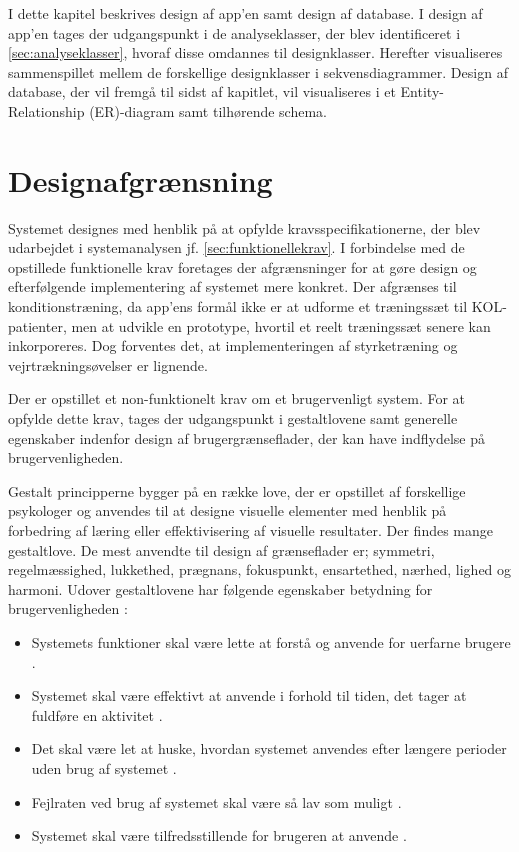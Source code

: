 I dette kapitel beskrives design af app'en samt design af database. I design af app'en tages der udgangspunkt i de analyseklasser, der blev identificeret i \autoref{sec:analyseklasser}, hvoraf disse omdannes til designklasser. Herefter visualiseres sammenspillet mellem de forskellige designklasser i sekvensdiagrammer. Design af database, der vil fremgå til sidst af kapitlet, vil visualiseres i et Entity-Relationship (ER)-diagram samt tilhørende schema. 

\section{Designafgrænsning} \label{sec:brugervenlighed}
Systemet designes med henblik på at opfylde kravsspecifikationerne, der blev udarbejdet i systemanalysen jf. \autoref{sec:funktionellekrav}. I forbindelse med de opstillede funktionelle krav foretages der afgrænsninger for at gøre design og efterfølgende implementering af systemet mere konkret. Der afgrænses til konditionstræning, da app'ens formål ikke er at udforme et træningssæt til KOL-patienter, men at udvikle en prototype, hvortil et reelt træningssæt senere kan inkorporeres. Dog forventes det, at implementeringen af styrketræning og vejrtrækningsøvelser er lignende. 

Der er opstillet et non-funktionelt krav om et brugervenligt system. For at opfylde dette krav, tages der udgangspunkt i gestaltlovene samt generelle egenskaber indenfor design af brugergrænseflader, der kan have indflydelse på brugervenligheden. 

Gestalt principperne bygger på en række love, der er opstillet af forskellige psykologer og anvendes til at designe visuelle elementer med henblik på forbedring af læring eller effektivisering af visuelle resultater. Der findes mange gestaltlove. De mest anvendte til design af grænseflader er; symmetri, regelmæssighed, lukkethed, prægnans, fokuspunkt, ensartethed, nærhed, lighed og harmoni.\cite{Chang2002} Udover gestaltlovene har følgende egenskaber betydning for brugervenligheden \cite{ferre2001}:
\begin{itemize}
\item Systemets funktioner skal være lette at forstå og anvende for uerfarne brugere \cite{ferre2001}.
\item Systemet skal være effektivt at anvende i forhold til tiden, det tager at fuldføre en aktivitet \cite{ferre2001}.
\item Det skal være let at huske, hvordan systemet anvendes efter længere perioder uden brug af systemet \cite{ferre2001}.
\item Fejlraten ved brug af systemet skal være så lav som muligt \cite{ferre2001}.
\item Systemet skal være tilfredsstillende for brugeren at anvende \cite{ferre2001}.
\end{itemize}
 

 






